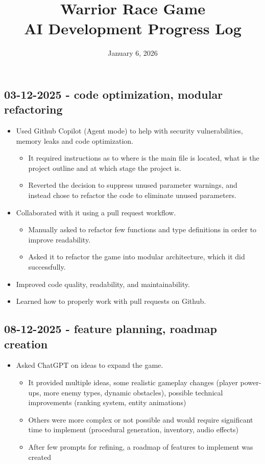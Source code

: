 \documentclass[11pt,a4paper]{article}
\title{Warrior Race Game \\ AI Development Progress Log}
\date{January 6, 2026}
\begin{document}
\maketitle

\addtocounter{section}{1}

\subsection{03-12-2025 - code optimization, modular refactoring}
\begin{itemize}
    \item Used Github Copilot (Agent mode) to help with security vulnerabilities, memory leaks and code optimization.
    \begin{itemize}
        \item It required instructions as to where is the main file is located, what is the project outline and at which stage the project is.
        \item Reverted the decision to suppress unused parameter warnings, and instead chose to refactor the code to eliminate unused parameters.
    \end{itemize}
    
    \item Collaborated with it using a pull request workflow.
    \begin{itemize}
        \item Manually asked to refactor few functions and type definitions in order to improve readability.
        \item Asked it to refactor the game into modular architecture, which it did successfully.
    \end{itemize}
    
    \item Improved code quality, readability, and maintainability.
    
    \item Learned how to properly work with pull requests on Github.
\end{itemize}

\subsection{08-12-2025 - feature planning, roadmap creation}
\begin{itemize}
    \item Asked ChatGPT on ideas to expand the game.
    \begin{itemize}
        \item It provided multiple ideas, some realistic gameplay changes (player power-ups, more enemy types, dynamic obstacles), possible technical improvements (ranking system, entity animations)
        \item Others were more complex or not possible and would require significant time to implement (procedural generation, inventory, audio effects)
        \item After few prompts for refining, a roadmap of features to implement was created
    \end{itemize}
\end{itemize}
\end{document}
